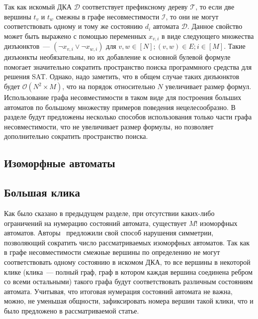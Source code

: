 Так как искомый ДКА $\mathcal{D}$ соответствует префиксному дереву $\mathcal{T}$, то если две вершины $t_{v}$ и $t_{w}$ смежны в графе несовместимости $\mathcal{I}$, то они не могут соответствовать одному и тому же состоянию $d_{i}$ автомата $\mathcal{D}$.
Данное свойство может быть выражено с помощью переменных $x_{v,i}$ в виде следующего множества дизъюнктов~{---} $\left(\neg x_{v,i} \vee \neg x_{w,i}\right)$ для $v,w \in \left[N\right]; \left(v,w\right) \in E; i \in \left[M\right]$.
Такие дизъюнкты необязательны, но их добавление к основной булевой формуле помогает значительно сократить пространство поиска программного средства для решения SAT. 
Однако, надо заметить, что в общем случае таких дизъюнктов будет $\mathcal{O}\left(N^{2} \times M\right)$, что на порядок относительно $N$ увеличивает размер формул. 
Использование графа несовместимости в таком виде для построения больших автоматов по большому множеству примеров поведения нецелесообразно. 
В разделе  будут предложены несколько способов использования только части графа несовместимости, что не увеличивает размер формулы, но позволяет дополнительно сократить пространство поиска.

\subsection{Изоморфные автоматы}
\label{sec:review:sym-breaking:isomorphic-automata}


\subsection{Большая клика}
\label{sec:review:sym-breaking:large-clique}

Как было сказано в предыдущем разделе, при отсутствии каких-либо ограничений на нумерацию состояний автомата, существует $M!$ изоморфных автоматов.
Авторы~\cite{heule-icgi10} предложили свой способ нарушения симметрии, позволяющий сократить число рассматриваемых изоморфных автоматов.
Так как в графе несовместимости смежные вершины по определению не могут соответствовать одному состоянию в искомом ДКА, то все вершины в некоторой клике (клика~{---} полный граф, граф в котором каждая вершина соединена ребром со всеми остальными)  такого графа будут соответствовать различным состояниям автомата.
Учитывая, что итоговая нумерация состояний автомата не важна, можно, не уменьшая общности, зафиксировать номера вершин такой клики, что и было предложено в рассматриваемой статье.


